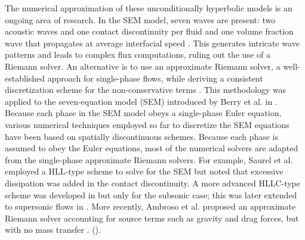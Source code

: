 \documentclass[preprint,10pt]{elsarticle}
\begin{document}
The numerical approximation of these unconditionally hyperbolic models is an ongoing area of research.
In the SEM model, seven waves are present: two acoustic waves and one contact discontinuity per fluid and one volume fraction wave that propagates 
at  average interfacial speed . This generates intricate wave patterns and leads to complex flux computations, ruling out the use of a Riemann solver. 
An alternative is to use an approximate Riemann solver, a well-established approach for single-phase flows, while deriving a consistent discretization 
scheme for the non-conservative terms \cite{Li_2004,Abgrall_2002}. 
This methodology was applied to the seven-equation model (SEM) introduced by Berry et al. in \cite{Berry_NED2010}. 
% 
Because each phase in the SEM model obeys a single-phase Euler equation, various numerical techniques employed so far to discretize the SEM equations have been 
based on spatially discontinuous schemes. Because each phase is assumed to obey the Euler equations, most of the numerical solvers are adapted from the single-phase approximate Riemann solvers. For example, Saurel et al. \cite{Saurel_2001a, Saurel_2001b} employed a HLL-type scheme to solve for the SEM but noted that excessive dissipation was added in the contact discontinuity. A more advanced HLLC-type scheme was developed in \cite{Li_2004} but only for the subsonic case; this was later extended to supersonic flows in \cite{Zein_2010}. More recently, Ambroso et al. \cite{Ambroso_2012} proposed an approximate Riemann solver accounting for source terms such as gravity and drag forces, but with no  mass transfer .  (). 
\end{document}
